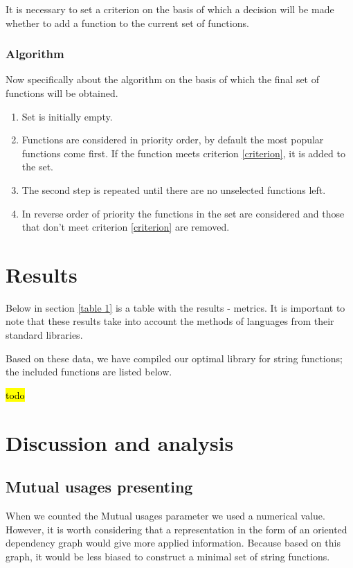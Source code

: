 \documentclass[anonymous,sigplan,review,11pt,nonacm,natbib=false]{acmart}
\begin{document}
    \label{criterion}

    It is necessary to set a criterion on the basis of which a decision will be made whether to add a function to the current set of functions.

    \subsubsection{Algorithm}

    Now specifically about the algorithm on the basis of which the final set of functions will be obtained.

    \begin{enumerate}
        \item Set is initially empty.
        \item Functions are considered in priority order, by default the most popular functions come first. If the function meets criterion \ref{criterion}, it is added to the set.
        \item The second step is repeated until there are no unselected functions left.
        \item In reverse order of priority the functions in the set are considered and those that don't meet criterion \ref{criterion} are removed.
    \end{enumerate}

    \section{Results}

    Below in section \ref{table 1} is a table with the results - metrics. It is important to note that these results take into account the methods of languages from their standard libraries.

    Based on these data, we have compiled our optimal library for string functions; the included functions are listed below.

    \hl{todo}

    \section{Discussion and analysis}

    \subsection{Mutual usages presenting}

    When we counted the Mutual usages parameter we used a numerical value. However, it is worth considering that a representation in the form of an oriented dependency graph would give more applied information. Because based on this graph, it would be less biased to construct a minimal set of string functions.
\end{document}
